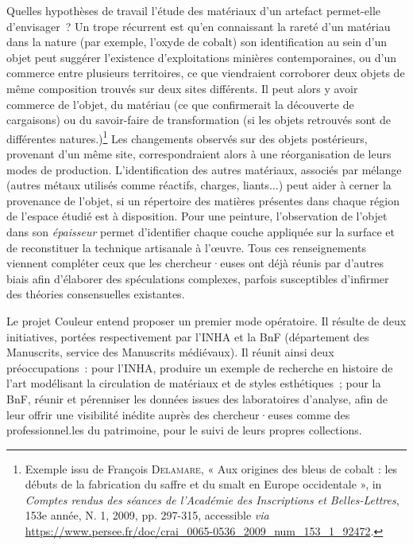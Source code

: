 \documentclass[a4paper,12pt, twoside]{book}
\begin{document}
Quelles hypothèses de travail l’étude des matériaux d’un artefact permet-elle d’envisager~?  Un trope récurrent est qu’en connaissant la rareté d’un matériau dans la nature (par exemple, l’oxyde de cobalt) son identification au sein d’un objet peut suggérer l’existence d’exploitations minières contemporaines, ou d’un commerce entre plusieurs territoires, ce que viendraient corroborer deux objets de même composition trouvés sur deux sites différents. Il peut alors y avoir commerce de l’objet, du matériau (ce que confirmerait la découverte de cargaisons) ou du savoir-faire de transformation (si les objets retrouvés sont de différentes natures.)\footnote{Exemple issu de François \textsc{Delamare}, « Aux origines des bleus de cobalt : les débuts de la fabrication du saffre et du smalt en Europe occidentale », in \textit{Comptes rendus des séances de l'Académie des Inscriptions et Belles-Lettres}, 153e année, N. 1, 2009, pp. 297-315, accessible \textit{via} \url{https://www.persee.fr/doc/crai_0065-0536_2009_num_153_1_92472}.} Les changements observés sur des objets postérieurs, provenant d’un même site, correspondraient alors à une réorganisation de leurs modes de production. L’identification des autres matériaux, associés par mélange (autres métaux utilisés comme réactifs, charges, liants...) peut aider à cerner la provenance de l’objet, si un répertoire des matières présentes dans chaque région de l’espace étudié est à disposition. Pour une peinture, l’observation de l’objet dans son \textit{épaisseur} permet d’identifier chaque couche appliquée sur la surface et de reconstituer la technique artisanale à l’œuvre. Tous ces renseignements viennent compléter ceux que les chercheur·euses ont déjà réunis par d’autres biais afin d’élaborer des spéculations complexes, parfois susceptibles d’infirmer des théories consensuelles existantes.

Le projet Couleur entend proposer un premier mode opératoire. Il résulte de deux initiatives, portées respectivement par l’INHA et la BnF (département des Manuscrits, service des Manuscrits médiévaux). Il réunit ainsi deux préoccupations~: pour l’INHA, produire un exemple de recherche en histoire de l’art modélisant la circulation de matériaux et de styles esthétiques~; pour la BnF, réunir et pérenniser les données issues des laboratoires d’analyse, afin de leur offrir une visibilité inédite auprès des chercheur·euses comme des professionnel.les du patrimoine, pour le suivi de leurs propres collections.
\end{document}
